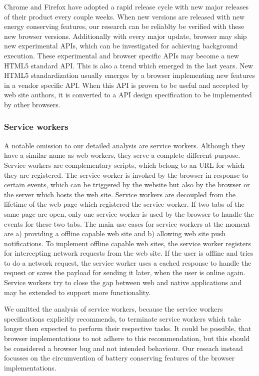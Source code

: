 \documentclass[article,type=bsc,colorback,accentcolor=tud9c]{tudthesis}
\begin{document}
  Chrome and Firefox have adopted a rapid release cycle with new major releases of their product every couple weeks. When new versions are released with new energy conserving features, our research can be reliablty be verified with these new browser versions. Additionally with every major update, browser may ship new experimental APIs, which can be investigated for achieving background execution. These experimental and browser specific APIs may become a new HTML5 standard API. This is also a trend which emerged in the last years. New HTML5 standardization usually emerges by a browser implementing new features in a vendor specific API. When this API is proven to be useful and accepted by web site authors, it is converted to a API design specification to be implemented by other browsers.
  
  \subsubsection{Service workers}

  A notable omission to our detailed analysis are service workers. Although they have a similar name as web workers, they serve a complete different purpose. Service workers are complementary scripts, which belong to an URL for which they are registered. The service worker is invoked by the browser in response to certain events, which can be triggered by the website but also by the browser or the server which hosts the web site. Service workers are decoupled from the lifetime of the web page which registered the service worker. If two tabs of the same page are open, only one service worker is used by the browser to handle the events for these two tabs. The main use cases for service workers at the moment are a) providing a offline capable web site and b) allowing web site push notifications. To implement offline capable web sites, the service worker registers for intercepting network requests from the web site. If the user is offline and tries to do a network request, the service worker uses a cached response to handle the request or saves the payload for sending it later, when the user is online again. Service workers try to close the gap between web and native applications and may be extended to support more functionality.

  We omitted the analysis of service workers, because the service workers specifications explicitly recommends, to terminate service workers which take longer then expected to perform their respective tasks. It could be possible, that browser implementations to not adhere to this recommendation, but this should be considered a browser bug and not intended behaviour. Our reseach instead focusses on the circumvention of battery conserving features of the browser implementations.
\end{document}
